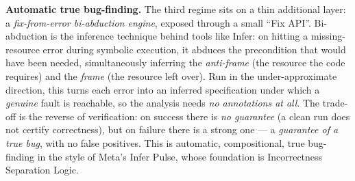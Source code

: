 \documentclass[11pt]{article}
\begin{document}
\textbf{Automatic true bug-finding.} The third regime sits on a thin additional layer: a \emph{fix-from-error bi-abduction engine}, exposed through a small ``Fix API''.
Bi-abduction is the inference technique behind tools like Infer: on hitting a missing-resource error during symbolic execution, it abduces the precondition that would have been needed, simultaneously inferring the \emph{anti-frame} (the resource the code requires) and the \emph{frame} (the resource left over).
Run in the under-approximate direction, this turns each error into an inferred specification under which a \emph{genuine} fault is reachable, so the analysis needs \emph{no annotations at all}.
The trade-off is the reverse of verification: on success there is \emph{no guarantee} (a clean run does not certify correctness), but on failure there is a strong one --- a \emph{guarantee of a true bug}, with no false positives.
This is automatic, compositional, true bug-finding in the style of Meta's Infer Pulse, whose foundation is Incorrectness Separation Logic.
\end{document}
